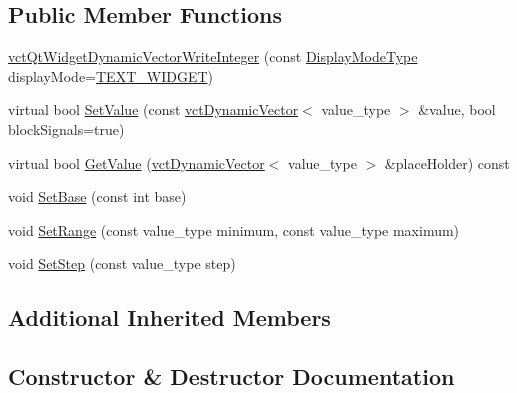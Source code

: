 \subsection*{Public Member Functions}
\begin{DoxyCompactItemize}
\item 
\hyperlink{classvct_qt_widget_dynamic_vector_write_integer_a384efbb51ef827c4995cbdd658069d71}{vct\+Qt\+Widget\+Dynamic\+Vector\+Write\+Integer} (const \hyperlink{classvct_qt_widget_dynamic_vector_write_base_aefbf6a51f1009f060305c2b5e106cf02}{Display\+Mode\+Type} display\+Mode=\hyperlink{classvct_qt_widget_dynamic_vector_write_base_aefbf6a51f1009f060305c2b5e106cf02aa84e1bae39afe989e862b07258d0889e}{T\+E\+X\+T\+\_\+\+W\+I\+D\+G\+E\+T})
\item 
virtual bool \hyperlink{classvct_qt_widget_dynamic_vector_write_integer_a1c2964bde86c1309e05fc8ebe3aadaf8}{Set\+Value} (const \hyperlink{classvct_dynamic_vector}{vct\+Dynamic\+Vector}$<$ value\+\_\+type $>$ \&value, bool block\+Signals=true)
\item 
virtual bool \hyperlink{classvct_qt_widget_dynamic_vector_write_integer_a8d4e00ee7e60c90afa1c501178363205}{Get\+Value} (\hyperlink{classvct_dynamic_vector}{vct\+Dynamic\+Vector}$<$ value\+\_\+type $>$ \&place\+Holder) const 
\item 
void \hyperlink{classvct_qt_widget_dynamic_vector_write_integer_a17834a29210aa8ba00c13866eb783257}{Set\+Base} (const int base)
\item 
void \hyperlink{classvct_qt_widget_dynamic_vector_write_integer_adbf25055074769c268162eda7b909d53}{Set\+Range} (const value\+\_\+type minimum, const value\+\_\+type maximum)
\item 
void \hyperlink{classvct_qt_widget_dynamic_vector_write_integer_a22ed60e31043a338f82e07cb7fba5aee}{Set\+Step} (const value\+\_\+type step)
\end{DoxyCompactItemize}
\subsection*{Additional Inherited Members}


\subsection{Constructor \& Destructor Documentation}
\hypertarget{classvct_qt_widget_dynamic_vector_write_integer_a384efbb51ef827c4995cbdd658069d71}{}
